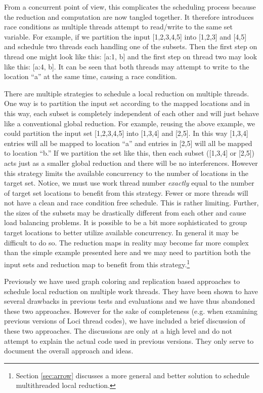 \documentclass{article}
\begin{document}
From a concurrent point of view, this complicates the scheduling process
because the reduction and computation are now tangled together.  It
therefore introduces race conditions as multiple threads attempt to
read/write to the same set variable.  For example, if we partition the
input [1,2,3,4,5] into [1,2,3] and [4,5] and schedule two threads each
handling one of the subsets.  Then the first step on thread one might
look like this: [a:1, b] and the first step on thread two may look like
this: [a:4, b].  It can be seen that both threads may attempt to write to
the location ``a'' at the same time, causing a race condition.

There are multiple strategies to schedule a local reduction on multiple
threads.  One way is to partition the input set according to the mapped
locations and in this way, each subset is completely independent of each
other and will just behave like a conventional global reduction.  For
example, reusing the above example, we could partition the input set
[1,2,3,4,5] into [1,3,4] and [2,5]. In this way [1,3,4] entries will all
be mapped to location ``a'' and entries in [2,5] will all be mapped to
location ``b.''  If we partition the set like this, then each subset
([1,3,4] or [2,5]) acts just as a smaller global reduction and there
will be no interferences.  However this strategy limits the available
concurrency to the number of locations in the target set.  Notice, we
must use work thread number {\em exactly} equal to the number of target
set locations to benefit from this strategy.  Fewer or more threads will
not have a clean and race condition free schedule.  This is rather
limiting.  Further, the sizes of the subsets may be drastically
different from each other and cause load balancing problems.  It is
possible to be a bit more sophisticated to group target locations to
better utilize available concurrency.  In general it may be difficult to
do so.  The reduction maps in reality may become far more complex than
the simple example presented here and we may need to partition both the
input sets and reduction map to benefit from this
strategy.\footnote{Section \ref{sec:arrow} discusses a more general and
better solution to schedule multithreaded local reduction.}

Previously we have used graph coloring and replication based approaches
to schedule local reduction on multiple work threads.  They have been
shown to have several drawbacks in previous tests and evaluations and we
have thus abandoned these two approaches.  However for the sake of
completeness (e.g. when examining previous versions of Loci thread
codes), we have included a brief discussion of these two approaches.
The discussions are only at a high level and do not attempt to explain
the actual code used in previous versions.  They only serve to document
the overall approach and ideas.
\end{document}
